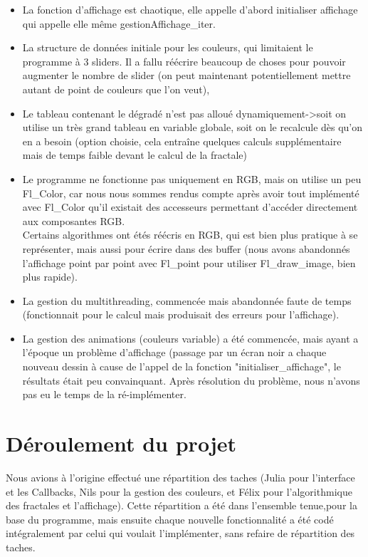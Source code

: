 \documentclass[a4paper,11pt]{article} \usepackage[T1]{fontenc} \usepackage[utf8]{inputenc} \usepackage[francais]{babel}
\begin{document}
\begin{itemize}
\item La fonction d'affichage est chaotique, elle appelle d'abord initialiser affichage qui appelle elle même gestionAffichage\_iter.%
\item La structure de données initiale pour les couleurs, qui limitaient le programme à 3 sliders. Il a fallu réécrire beaucoup de choses pour pouvoir augmenter le nombre de slider (on peut maintenant potentiellement mettre autant de point de couleurs que l'on veut),
\item Le tableau contenant le dégradé n'est pas alloué dynamiquement->soit on utilise un très grand tableau en variable globale, soit on le recalcule dès qu'on en a besoin (option choisie, cela entraîne quelques calculs supplémentaire mais de temps faible devant le calcul de la fractale)
\item Le programme ne fonctionne pas uniquement en RGB, mais on utilise un peu Fl\_Color, car nous nous sommes rendus compte après avoir tout implémenté avec Fl\_Color qu'il existait des accesseurs permettant d’accéder directement aux composantes RGB.\\
Certains algorithmes ont étés réécris en RGB, qui est bien plus pratique à se représenter, mais aussi pour écrire dans des buffer (nous avons abandonnés l'affichage point par point avec Fl\_point pour utiliser Fl\_draw\_image, bien plus rapide).
\item La gestion du multithreading, commencée mais abandonnée faute de temps (fonctionnait pour le calcul mais produisait des erreurs pour l'affichage).
\item La gestion des animations (couleurs variable) a été commencée, mais ayant a l'époque un problème d'affichage (passage par un écran noir a chaque nouveau dessin à cause de l'appel de la fonction "initialiser\_affichage", le résultats était peu convainquant. Après résolution du problème, nous n'avons pas eu le temps de la ré-implémenter.
\end{itemize}


\section{Déroulement du projet}
Nous avions à l'origine effectué une répartition des taches (Julia pour l'interface et les Callbacks, Nils pour la gestion des couleurs, et Félix pour l'algorithmique des fractales et l'affichage). Cette répartition a été dans l'ensemble tenue,pour la base du programme, mais ensuite chaque nouvelle fonctionnalité a été codé intégralement par celui qui voulait l'implémenter, sans refaire de répartition des taches. 
\end{document}
